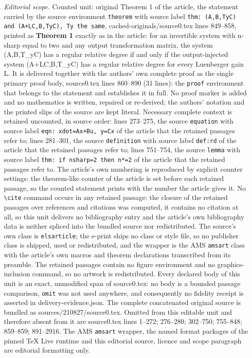 \documentclass[10pt,a4paper]{amsart}
\begin{document}
\noindent\textit{Editorial scope.} Counted unit: original Theorem 1 of the article, the statement carried by the source environment \texttt{theorem} with source label \texttt{thm: (A,B,TyC) and (A+LC,B,TyC), Ty the same}, cached-originals/source0.tex lines 849--858, printed as \textbf{Theorem 1} exactly as in the article: for an invertible system with n-sharp equal to two and any output transformation matrix, the system (A,B,T\_yC) has a regular relative degree if and only if the output-injected system (A+LC,B,T\_yC) has a regular relative degree for every Luenberger gain L. It is delivered together with the authors' own complete proof as the single primary proof body, source0.tex lines 860--890 (31 lines): the \texttt{proof} environment that belongs to the statement and establishes it in full. No proof marker is added and no mathematics is written, repaired or re-derived; the authors' notation and the printed slips of the source are kept literal. Necessary complete context is retained uncounted, in source order: lines 273--275, the source \texttt{equation} with source label \texttt{eqn: xdot=Ax+Bu, y=Cx} of the article that the retained passages refer to; lines 281--301, the source \texttt{definition} with source label \texttt{def:rd} of the article that the retained passages refer to; lines 751--754, the source \texttt{lemma} with source label \texttt{thm: if nsharp=2 then n*=2} of the article that the retained passages refer to. The article's own numbering is reproduced by explicit counter settings: the theorem-like counter of the article is set before each retained passage, so the counted statement prints with the number the article gives it. No \texttt{\textbackslash cite} command occurs in any retained passage: the closure of the retained passages over references and citations was computed, it contains no citation at all, so this unit delivers no bibliography entry and the article's own bibliography data is neither spliced into the bundled source nor redistributed. The source's own class is \texttt{elsarticle}; the e-print ships no class or style file, so no publisher class is shipped, used or redistributed, and the wrapper is the AMS \texttt{amsart} class with the article's own macros and theorem declarations transcribed from its preamble. The retained passages contain no figure environment and no graphics-inclusion command, so no artwork is redistributed. Every declared body of this unit is an exact, unmodified span of source0.tex: no body is a bounded passage comparison, \texttt{omit} was not used anywhere, and consequently no fidelity receipt is asserted in delivery-evidence.json. The complete concatenated original source is bundled as sources/210827/source0.tex. Omitted from this editable unit and therefore absent from it are source0.tex lines 1--272; 276--280; 302--750; 755--848; 859--859; 891--2916. The AMS \texttt{amsart} wrapper, the named format packages of the pinned TeX Live runtime and this editorial source, licence and scope paragraph are editorial formatting only.\par\smallskip
\end{document}

